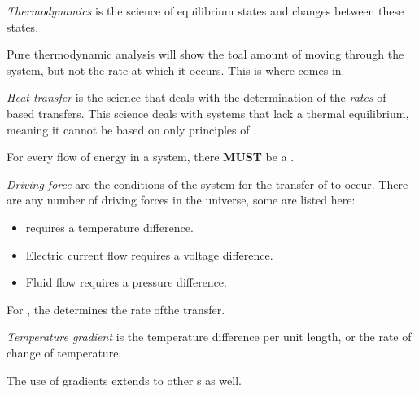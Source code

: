 \begin{definition}[Thermodynamics]\label{def:Thermodynamics}
  \emph{Thermodynamics} is the science of equilibrium states and changes between these states.
\end{definition}

Pure thermodynamic analysis will show the toal amount of  moving through the system, but not the rate at which it occurs.
This is where  comes in.

\begin{definition}\label{def:Heat_Transfer}
  \emph{Heat transfer} is the science that deals with the determination of the \textit{rates} of -based  transfers.
  This science deals with systems that lack a thermal equilibrium, meaning it cannot be based on only principles of .
\end{definition}

For every flow of energy in a system, there \textbf{MUST} be a .
\begin{definition}\label{def:Driving_Force}
  \emph{Driving force} are the conditions of the system for the transfer of  to occur.
  There are any number of driving forces in the universe, some are listed here:
  \begin{itemize}[noitemsep]
  \item {} requires a temperature difference.
  \item Electric current flow requires a voltage difference.
  \item Fluid flow requires a pressure difference.
  \end{itemize}
\end{definition}

For , the  determines the rate ofthe transfer.

\begin{definition}\label{def:Temperature_Gradient}
  \emph{Temperature gradient} is the temperature difference per unit length, or the rate of change of temperature.

  \begin{remark}[Extension]
    The use of gradients extends to other s as well.
  \end{remark}
\end{definition}

